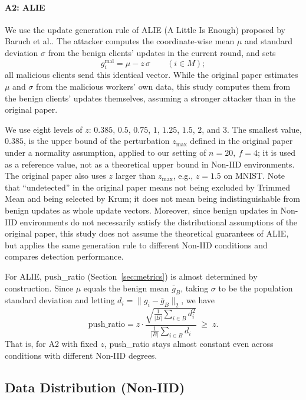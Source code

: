 \documentclass[a4paper,10pt]{article}
\newcommand{\PushRatio}{\textrm{push\_ratio}}
\begin{document}
\paragraph{A2: ALIE}
We use the update generation rule of ALIE (A Little Is Enough) proposed by Baruch et al.\cite{baruch2019little}. The attacker computes the coordinate-wise mean $\mu$ and standard deviation $\sigma$ from the benign clients' updates in the current round, and sets
\begin{equation}
g_i^{\text{mal}} = \mu - z\,\sigma \qquad (i \in M);
\label{eq:alie}
\end{equation}
all malicious clients send this identical vector. While the original paper estimates $\mu$ and $\sigma$ from the malicious workers' own data, this study computes them from the benign clients' updates themselves, assuming a stronger attacker than in the original paper.

We use eight levels of $z$: $0.385$, $0.5$, $0.75$, $1$, $1.25$, $1.5$, $2$, and $3$. The smallest value, $0.385$, is the upper bound of the perturbation $z_{\max}$ defined in the original paper under a normality assumption, applied to our setting of $n=20,\ f=4$; it is used as a reference value, not as a theoretical upper bound in Non-IID environments. The original paper also uses $z$ larger than $z_{\max}$, e.g., $z=1.5$ on MNIST. Note that ``undetected'' in the original paper means not being excluded by Trimmed Mean and being selected by Krum; it does not mean being indistinguishable from benign updates as whole update vectors. Moreover, since benign updates in Non-IID environments do not necessarily satisfy the distributional assumptions of the original paper, this study does not assume the theoretical guarantees of ALIE, but applies the same generation rule to different Non-IID conditions and compares detection performance.

For ALIE, \PushRatio{} (Section~\ref{sec:metrics}) is almost determined by construction. Since $\mu$ equals the benign mean $\bar{g}_B$, taking $\sigma$ to be the population standard deviation and letting $d_i = \|g_i - \bar{g}_B\|_2$, we have
\begin{equation}
\PushRatio
= z \cdot \frac{\sqrt{\frac{1}{|B|}\sum_{i \in B} d_i^2}}{\frac{1}{|B|}\sum_{i \in B} d_i}
\;\ge\; z .
\label{eq:alie-pushratio}
\end{equation}
That is, for A2 with fixed $z$, \PushRatio{} stays almost constant even across conditions with different Non-IID degrees.

\subsection{Data Distribution (Non-IID)}
\label{sec:data-noniid}
\end{document}
